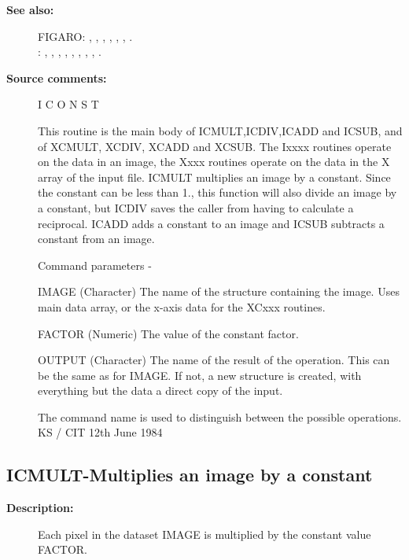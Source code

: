 \begin{description}
\begin{description}
\item [\textbf{See also:}]
FIGARO: , , , , , , .\\
: , , , , , , , , .\\

\item [\textbf{Source comments:}]
\begin{terminalv}
 I C O N S T

 This routine is the main body of ICMULT,ICDIV,ICADD and ICSUB,
 and of XCMULT, XCDIV, XCADD and XCSUB.  The Ixxxx routines
 operate on the data in an image, the Xxxx routines operate on
 the data in the X array of the input file.
 ICMULT multiplies an image by a constant.  Since the constant
 can be less than 1., this function will also divide an
 image by a constant, but ICDIV saves the caller from having
 to calculate a reciprocal. ICADD adds a constant to an image and
 ICSUB subtracts a constant from an image.

 Command parameters -

 IMAGE  (Character) The name of the structure containing the image.
        Uses main data array, or the x-axis data for the XCxxx routines.

 FACTOR (Numeric) The value of the constant factor.

 OUTPUT (Character) The name of the result of the operation.  This
        can be the same as for IMAGE.  If not, a new structure
        is created, with everything but the data a direct
        copy of the input.

 The command name is used to distinguish between the
 possible operations.
                                  KS / CIT 12th June 1984
\end{terminalv}
\end{description}
\subsection{ICMULT-\label{ICMULT}Multiplies an image by a constant}
\begin{description}

\item [\textbf{Description:}]
 Each pixel in the dataset IMAGE is multiplied by the
 constant value FACTOR.


\end{description}
\end{description}
